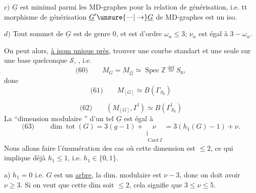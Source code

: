 $c)$  $\underline G$ est minimal parmi les MD-graphes pour la relation de générisation, i.e. tt morphisme de générisation $\underline G'\unsure{\mathbin{\text{---}}|\to}\underline G$ de MD-graphes est un iso.

$d)$ Tout sommet \inserted{$\alpha$} de $\underline G$ est de genre $0$, et est d'ordre  $\omega_\alpha\leq3$;   $\nu_\alpha$ est égal à $3-\omega_\alpha$.

On peut alors, \uline{à isom unique près}, trouver une courbe standart  et une seule sur une base quelconque $\mathcal S$, , i.e.
\[
\text{(60)}\qquad M_G=M_{\widehat G}\simeq\operatorname{Spec}\mathbb Z\overset{\mathrm{déf}}=S_0,
\]
donc
\[
\text{(61)}\qquad M_{[G]}\simeq B(\Gamma_{S_0})
\]

\[
\text{(62)}\qquad(M_{[G]},\Gamma^!)\simeq B(\Gamma^!_{S_0})
\]
La ``dimension modulaire '' d'un tel $\underline G$ est égal à
\[
\text{(63)}\qquad\dim\operatorname{tot}(G)=3(g-1)+\underset{\substack{\Vert\\\operatorname{Card}I}}{\nu}=3(h_1(G)-1)+\nu.
\]
Nous allons faire l'énumération des cas où cette dimension est $\leq2$, ce qui implique déjà $h_1\leq1$, i.e. $h_1\in\{0,1\}$.


a) $h_1=0$ i.e. $G$ est un \uline{arbre}, la dim. modulaire est $\nu-3$, donc on doit avoir $\nu\geq3$. Si on veut que cette dim soit $\leq2$, cela signifie que $3\leq\nu\leq5$.


